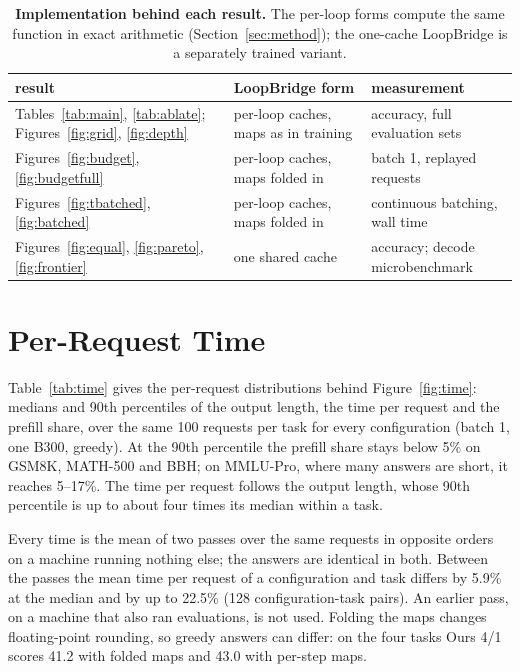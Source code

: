 \documentclass[11pt]{article}
\begin{document}
\begin{table}[h]
\centering\footnotesize
\setlength\tabcolsep{2.5pt}
\begin{tabular}{@{}p{}p{}p{}@{}}
\toprule
result & LoopBridge form & measurement \\
\midrule
Tables~\ref{tab:main}, \ref{tab:ablate}; Figures~\ref{fig:grid}, \ref{fig:depth} & per-loop caches, maps as in
training & accuracy, full evaluation sets \\
Figures~\ref{fig:budget}, \ref{fig:budgetfull} & per-loop caches, maps folded in & batch 1, replayed requests \\
Figures~\ref{fig:tbatched}, \ref{fig:batched} & per-loop caches, maps folded in & continuous batching, wall time \\
Figures~\ref{fig:equal}, \ref{fig:pareto}, \ref{fig:frontier} & one shared cache & accuracy; decode
microbenchmark \\
\bottomrule
\end{tabular}
\caption{\textbf{Implementation behind each result.} The per-loop forms compute the same function in exact arithmetic
(Section~\ref{sec:method}); the one-cache LoopBridge is a separately trained variant.}
\label{tab:impl}
\end{table}

\section{Per-Request Time}
\label{app:time}

Table~\ref{tab:time} gives the per-request distributions behind Figure~\ref{fig:time}: medians and 90th percentiles of
the output length, the time per request and the prefill share, over the same 100 requests per task for every
configuration (batch 1, one B300, greedy). At the 90th percentile the prefill share stays below 5\% on GSM8K, MATH-500
and BBH; on MMLU-Pro, where many answers are short, it reaches 5--17\%. The time per request follows the output
length, whose 90th percentile is up to about four times its median within a task.

Every time is the mean of two passes over the same requests in opposite orders on a machine running nothing else; the
answers are identical in both. Between the passes the mean time per request of a configuration and task differs by
5.9\% at the median and by up to 22.5\% (128 configuration-task pairs). An earlier pass, on a machine that also ran
evaluations, is not used. Folding the maps changes floating-point rounding, so greedy answers can differ: on the four
tasks Ours 4/1 scores 41.2 with folded maps and 43.0 with per-step maps.
\end{document}
